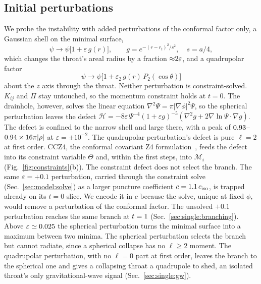 \documentclass[twocolumn,floatfix,aps,prd,superscriptaddress,nofootinbib]{revtex4-2}
\begin{document}
\subsection{Initial perturbations}
\label{sec:model:seeds}

We probe the instability with added perturbations of the conformal factor only, a Gaussian shell on the minimal surface,
\begin{equation}
\psi \to \psi\bigl[1 + \varepsilon\, g(r)\bigr],\qquad
g = e^{-(r-r_t)^2/s^2},\quad s = a/4,
\label{eq:seed}
\end{equation}
which changes the throat's areal radius by a fraction ${\approx}2\varepsilon$, and a quadrupolar factor
\begin{equation}
\psi \to \psi\bigl[1 + \varepsilon_2\, g(r)\,P_2(\cos\theta)\bigr]
\end{equation}
about the $z$ axis through the throat. Neither perturbation is constraint-solved. $K_{ij}$ and $\Pi$ stay untouched, so the momentum constraint holds at $t=0$. The drainhole, however, solves the linear equation $\nabla^2\Psi=\pi|\nabla\phi|^2\Psi$, so the spherical perturbation leaves the defect $\mathcal H=-8\varepsilon\,\Psi^{-4}(1+\varepsilon g)^{-5}(\nabla^2g+2\nabla\ln\Psi\cdot\nabla g)$. The defect is confined to the narrow shell and large there, with a peak of $0.93$--$0.94\times16\pi|\rho|$ at $\varepsilon=\pm10^{-2}$. The quadrupolar perturbation's defect is pure $\ell=2$ at first order. CCZ4, the conformal covariant Z4 formulation~\cite{alic2012}, feeds the defect into its constraint variable $\Theta$ and, within the first steps, into $\mathcal M_i$ (Fig.~\ref{fig:constraints}(b)). The constraint defect does not select the branch. The same $\varepsilon=+0.1$ perturbation, carried through the constraint solve (Sec.~\ref{sec:model:solve}) as a larger puncture coefficient $c=1.1\,c_{\rm iso}$, is trapped already on its $t=0$ slice. We encode it in $c$ because the solve, unique at fixed $\phi$, would remove a perturbation of the conformal factor. The unsolved $+0.1$ perturbation reaches the same branch at $t=1$ (Sec.~\ref{sec:single:branching}). Above $\varepsilon\simeq0.025$ the spherical perturbation turns the minimal surface into a maximum between two minima. The spherical perturbation selects the branch but cannot radiate, since a spherical collapse has no $\ell\ge2$ moment. The quadrupolar perturbation, with no $\ell=0$ part at first order, leaves the branch to the spherical one and gives a collapsing throat a quadrupole to shed, an isolated throat's only gravitational-wave signal (Sec.~\ref{sec:single:gw}).
\end{document}
